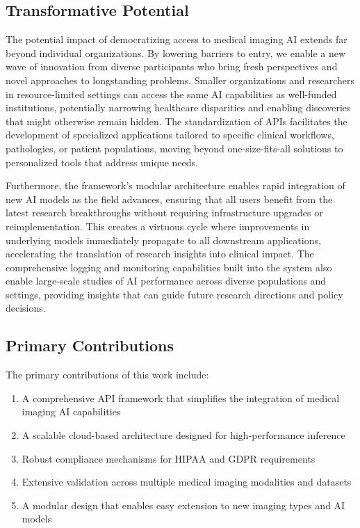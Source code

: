 \documentclass[12pt,a4paper]{article}
\begin{document}
\subsection{Transformative Potential}

The potential impact of democratizing access to medical imaging AI extends far beyond individual organizations. By lowering barriers to entry, we enable a new wave of innovation from diverse participants who bring fresh perspectives and novel approaches to longstanding problems. Smaller organizations and researchers in resource-limited settings can access the same AI capabilities as well-funded institutions, potentially narrowing healthcare disparities and enabling discoveries that might otherwise remain hidden. The standardization of APIs facilitates the development of specialized applications tailored to specific clinical workflows, pathologies, or patient populations, moving beyond one-size-fits-all solutions to personalized tools that address unique needs.

Furthermore, the framework's modular architecture enables rapid integration of new AI models as the field advances, ensuring that all users benefit from the latest research breakthroughs without requiring infrastructure upgrades or reimplementation. This creates a virtuous cycle where improvements in underlying models immediately propagate to all downstream applications, accelerating the translation of research insights into clinical impact. The comprehensive logging and monitoring capabilities built into the system also enable large-scale studies of AI performance across diverse populations and settings, providing insights that can guide future research directions and policy decisions.

\subsection{Primary Contributions}

The primary contributions of this work include:

\begin{enumerate}
    \item A comprehensive API framework that simplifies the integration of medical imaging AI capabilities
    \item A scalable cloud-based architecture designed for high-performance inference
    \item Robust compliance mechanisms for HIPAA and GDPR requirements
    \item Extensive validation across multiple medical imaging modalities and datasets
    \item A modular design that enables easy extension to new imaging types and AI models
\end{enumerate}
\end{document}
